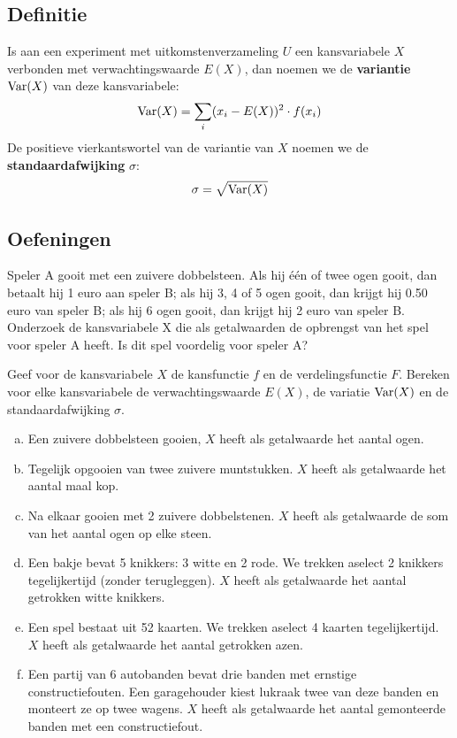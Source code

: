 \documentclass[a4paper,12pt, twoside]{article}
\begin{document}
\pagebreak
\subsection{Definitie}

\begin{mdframed}
Is aan een experiment met uitkomstenverzameling $U$ een kansvariabele $X$ verbonden met verwachtingswaarde $E(X)$, dan noemen we de {\bf variantie} $\Var(X)$ van deze kansvariabele:
$$\Var(X)=\sum_i(x_i-E(X))^2\cdot f(x_i)$$
De positieve vierkantswortel van de variantie van $X$ noemen we de {\bf standaardafwijking} $\sigma$:
$$\sigma=\sqrt{\Var(X)}$$
\end{mdframed}

\subsection{Oefeningen}

\begin{oefening}
Speler A gooit met een zuivere dobbelsteen. Als hij één of twee ogen gooit, dan betaalt hij 1 euro aan speler B; als hij 3, 4 of 5 ogen gooit, dan krijgt hij 0.50 euro van speler B; als hij 6 ogen gooit, dan krijgt hij 2 euro van speler B.\\
Onderzoek de kansvariabele X die als getalwaarden de opbrengst van het spel voor speler A heeft. Is dit spel voordelig voor speler A?
\end{oefening}

\begin{oefening}
Geef voor de kansvariabele $X$ de kansfunctie $f$ en de verdelingsfunctie $F$. Bereken voor elke kansvariabele de verwachtingswaarde $E(X)$, de variatie $\Var(X)$ en de standaardafwijking $\sigma$.
\begin{enumerate}[(a)]
  \item Een zuivere dobbelsteen gooien, $X$ heeft als getalwaarde het aantal ogen.
  \item Tegelijk opgooien van twee zuivere muntstukken. $X$ heeft als getalwaarde het aantal maal kop.
  \item Na elkaar gooien met 2 zuivere dobbelstenen. $X$ heeft als getalwaarde de som van het aantal ogen op elke steen.
  \item Een bakje bevat 5 knikkers: 3 witte en 2 rode. We trekken aselect 2 knikkers tegelijkertijd (zonder terugleggen). $X$ heeft als getalwaarde het aantal getrokken witte knikkers.
  \item Een spel bestaat uit 52 kaarten. We trekken aselect 4 kaarten tegelijkertijd. $X$ heeft als getalwaarde het aantal getrokken azen.
  \item Een partij van 6 autobanden bevat drie banden met ernstige constructiefouten. Een garagehouder kiest lukraak twee van deze banden en monteert ze op twee wagens. $X$ heeft als getalwaarde het aantal gemonteerde banden met een constructiefout.
\end{enumerate}
\end{oefening}
\end{document}
